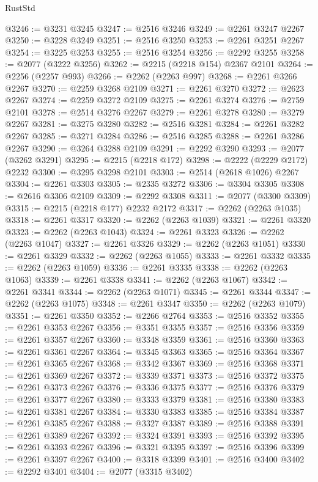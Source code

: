 \begin{lexlean}{RustStd}
\begin{coremodule}
@3246 := @3231 @3245
@3247 := @2516 @3246
@3249 := @2261 @3247 @2267
@3250 := @3228 @3249
@3251 := @2516 @3250
@3253 := @2261 @3251 @2267
@3254 := @3225 @3253
@3255 := @2516 @3254
@3256 := @2292 @3255
@3258 := @2077 (@3222 @3256)
@3262 := @2215 (@2218 @154) @2367 @2101
@3264 := @2256 (@2257 @993)
@3266 := @2262 (@2263 @997)
@3268 := @2261 @3266 @2267
@3270 := @2259 @3268 @2109
@3271 := @2261 @3270
@3272 := @2623 @2267
@3274 := @2259 @3272 @2109
@3275 := @2261 @3274
@3276 := @2759 @2101
@3278 := @2514 @3276 @2267
@3279 := @2261 @3278
@3280 := @3279 @2267
@3281 := @3275 @3280
@3282 := @2516 @3281
@3284 := @2261 @3282 @2267
@3285 := @3271 @3284
@3286 := @2516 @3285
@3288 := @2261 @3286 @2267
@3290 := @3264 @3288 @2109
@3291 := @2292 @3290
@3293 := @2077 (@3262 @3291)
@3295 := @2215 (@2218 @172)
@3298 := @2222 (@2229 @2172) @2232
@3300 := @3295 @3298 @2101
@3303 := @2514 (@2618 @1026) @2267
@3304 := @2261 @3303
@3305 := @2335 @3272
@3306 := @3304 @3305
@3308 := @2616 @3306 @2109
@3309 := @2292 @3308
@3311 := @2077 (@3300 @3309)
@3315 := @2215 (@2218 @177) @2232 @2172
@3317 := @2262 (@2263 @1035)
@3318 := @2261 @3317
@3320 := @2262 (@2263 @1039)
@3321 := @2261 @3320
@3323 := @2262 (@2263 @1043)
@3324 := @2261 @3323
@3326 := @2262 (@2263 @1047)
@3327 := @2261 @3326
@3329 := @2262 (@2263 @1051)
@3330 := @2261 @3329
@3332 := @2262 (@2263 @1055)
@3333 := @2261 @3332
@3335 := @2262 (@2263 @1059)
@3336 := @2261 @3335
@3338 := @2262 (@2263 @1063)
@3339 := @2261 @3338
@3341 := @2262 (@2263 @1067)
@3342 := @2261 @3341
@3344 := @2262 (@2263 @1071)
@3345 := @2261 @3344
@3347 := @2262 (@2263 @1075)
@3348 := @2261 @3347
@3350 := @2262 (@2263 @1079)
@3351 := @2261 @3350
@3352 := @2266 @2764
@3353 := @2516 @3352
@3355 := @2261 @3353 @2267
@3356 := @3351 @3355
@3357 := @2516 @3356
@3359 := @2261 @3357 @2267
@3360 := @3348 @3359
@3361 := @2516 @3360
@3363 := @2261 @3361 @2267
@3364 := @3345 @3363
@3365 := @2516 @3364
@3367 := @2261 @3365 @2267
@3368 := @3342 @3367
@3369 := @2516 @3368
@3371 := @2261 @3369 @2267
@3372 := @3339 @3371
@3373 := @2516 @3372
@3375 := @2261 @3373 @2267
@3376 := @3336 @3375
@3377 := @2516 @3376
@3379 := @2261 @3377 @2267
@3380 := @3333 @3379
@3381 := @2516 @3380
@3383 := @2261 @3381 @2267
@3384 := @3330 @3383
@3385 := @2516 @3384
@3387 := @2261 @3385 @2267
@3388 := @3327 @3387
@3389 := @2516 @3388
@3391 := @2261 @3389 @2267
@3392 := @3324 @3391
@3393 := @2516 @3392
@3395 := @2261 @3393 @2267
@3396 := @3321 @3395
@3397 := @2516 @3396
@3399 := @2261 @3397 @2267
@3400 := @3318 @3399
@3401 := @2516 @3400
@3402 := @2292 @3401
@3404 := @2077 (@3315 @3402)

\end{coremodule}
\end{lexlean}
